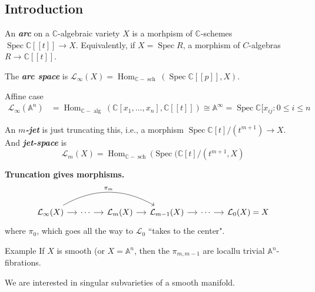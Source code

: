 \subsection{Introduction}

\begin{defn}\leavevmode
	An \textit{\textbf{arc}} on a \(\mathbb{C}\)-algebraic variety \(X\) is a morhpism of \(\mathbb{C}\)-schemes \(\operatorname{Spec}\mathbb{C}[[t]] \to X\). Equivalently, if \(X = \operatorname{Spec} R\), a morphism of \(C\)-algebras \(R \to \mathbb{C}[[t]]\).

	The \textit{\textbf{arc space}} is \(\mathcal{L}_\infty(X) = \operatorname{Hom}_{\mathbb{C}-\operatorname{s c h}}(\operatorname{Spec} \mathbb{C}[[p ]],X)\).
\end{defn}

\begin{thing6}{Affine case}\leavevmode
\begin{align*}
	\mathcal{L}_{\infty}(\mathbb{A}^n)&=\operatorname{Hom}_{\mathbb{C}-\operatorname{a l g}}(\mathbb{C}[x_1,\ldots,x_n],\mathbb{C}[ [ t ] ]) \cong \mathbb{A}^\infty= \operatorname{Spec} \mathbb{C}[x_{ij}:0 \leq  i \leq n
\end{align*}
\end{thing6}

\begin{defn}\leavevmode
	An \textit{\textbf{\(m\)-jet}} is just truncating this, i.e., a morphism \(\operatorname{Spec}\mathbb{C}[t]/(t^{m+1}) \to X\). And \textit{\textbf{jet-space}} is
	\[\mathcal{L}_m(X)= \operatorname{Hom}_{\mathbb{C}-\operatorname{s c h}}(\operatorname{Spec}(\mathbb{C}[t]/(t^{m+1},X)\]
\end{defn}

\textbf{Truncation gives morphisms.} 
\[\begin{tikzcd}[column sep=small]
	\mathcal{L}_\infty(X)\arrow[r]\arrow[rrr,bend left,"\pi_m"]&\cdots \arrow[r]&\mathcal{L}_m(X)\arrow[r]&\mathcal{L}_{m-1}(X)\arrow[r]&\cdots \arrow[r]&\mathcal{L}_0(X)=X
\end{tikzcd}\]
where \(\pi_0\), which goes all the way to \(\mathcal{L}_0\) ``takes to the center".
\begin{thing4}{Example}\leavevmode
If \(X\) is smooth (or \(X= \mathbb{A}^n\), then the  \(\pi_{m,m-1}\) are locallu trivial \(\mathbb{A}^n\)-fibrations.
\end{thing4}

{\color{6}We are interested in singular subvarieties of a smooth manifold.}

